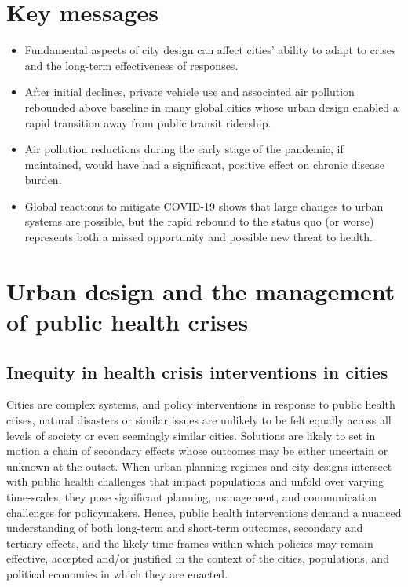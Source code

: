 \documentclass[preprint,10pt]{elsarticle} %
\begin{document}
\section*{Key messages}
\begin{itemize}
    \item[]  Fundamental aspects of city design can affect cities' ability to adapt to crises and the long-term effectiveness of responses.
    \item[] After initial declines, private vehicle use and associated air pollution rebounded above baseline in many global cities whose urban design enabled a rapid transition away from public transit ridership.
    \item[] Air pollution reductions during the early stage of the pandemic, if maintained, would have had a significant, positive effect on chronic disease burden. 
    \item[] Global reactions to mitigate COVID-19 shows that large changes to urban systems are possible, but the rapid rebound to the status quo (or worse) represents both a missed opportunity and possible new threat to health.
\end{itemize}

\section*{\textcolor{OliveGreen}{Urban design and the management of public health crises}}
\subsection*{Inequity in health crisis interventions in cities}

Cities are complex systems\cite{DiezRoux2015}, and policy interventions in response to public health crises, natural disasters or similar issues are unlikely to be felt equally across all levels of society or even seemingly similar cities. Solutions are likely to set in motion a chain of secondary effects whose outcomes may be either uncertain or unknown at the outset\cite{Sterman2006}. When urban planning regimes and city designs intersect with public health challenges that impact populations and unfold over varying time-scales\cite{casti2012x}, they pose significant planning, management, and communication challenges for policymakers\cite{thompson2022modelling,thompson2022framework}. Hence, public health interventions demand a nuanced understanding of both long-term and short-term outcomes, secondary and tertiary effects, and the likely time-frames within which policies may remain effective, accepted and/or justified in the context of the cities, populations, and political economies in which they are enacted\cite{dawson2016snakes, oliu2021sars}.
\end{document}
